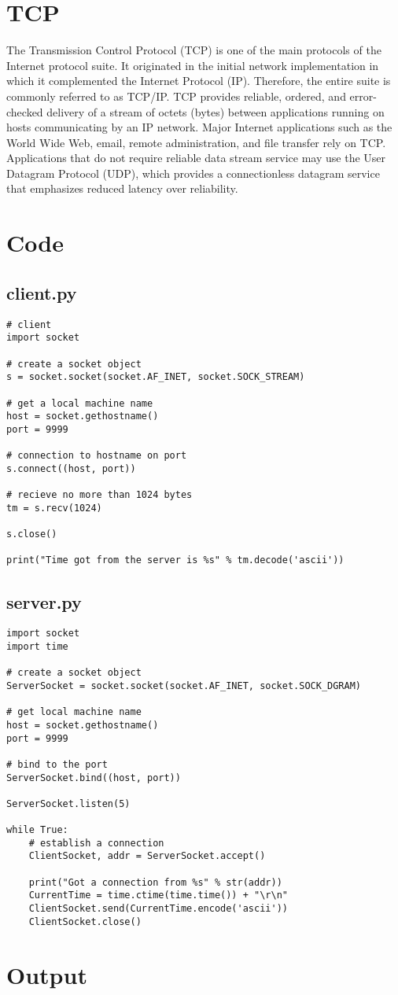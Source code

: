 \documentclass[a4paper,12pt]{article}
\begin{document}
\section{TCP}
The Transmission Control Protocol (TCP) is one of the main protocols of the Internet protocol suite. It originated in the initial network implementation in which it complemented the Internet Protocol (IP). Therefore, the entire suite is commonly referred to as TCP/IP. TCP provides reliable, ordered, and error-checked delivery of a stream of octets (bytes) between applications running on hosts communicating by an IP network. Major Internet applications such as the World Wide Web, email, remote administration, and file transfer rely on TCP. Applications that do not require reliable data stream service may use the User Datagram Protocol (UDP), which provides a connectionless datagram service that emphasizes reduced latency over reliability.

\section{Code} 
\subsection{client.py}
\begin{verbatim}
# client
import socket

# create a socket object
s = socket.socket(socket.AF_INET, socket.SOCK_STREAM)

# get a local machine name
host = socket.gethostname()
port = 9999

# connection to hostname on port
s.connect((host, port)) 

# recieve no more than 1024 bytes
tm = s.recv(1024)

s.close()

print("Time got from the server is %s" % tm.decode('ascii'))
\end{verbatim}
\subsection{server.py}
\begin{verbatim}
import socket
import time

# create a socket object
ServerSocket = socket.socket(socket.AF_INET, socket.SOCK_DGRAM)

# get local machine name
host = socket.gethostname()
port = 9999

# bind to the port
ServerSocket.bind((host, port))

ServerSocket.listen(5)

while True:
    # establish a connection
    ClientSocket, addr = ServerSocket.accept()

    print("Got a connection from %s" % str(addr))
    CurrentTime = time.ctime(time.time()) + "\r\n"
    ClientSocket.send(CurrentTime.encode('ascii'))
    ClientSocket.close()
\end{verbatim}

\section{Output}
\end{document}

